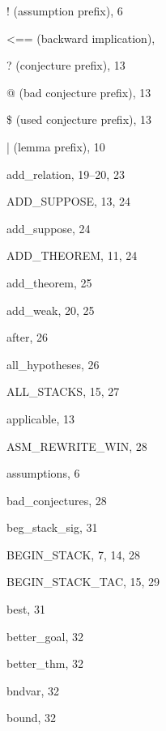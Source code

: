 \begin{theindex}

  \item {{\ptt !} (assumption prefix)}, 6
  \item {{\ptt <==} (backward implication)}, 
  \item {{\ptt ?} (conjecture prefix)}, 13
  \item {{\ptt @} (bad conjecture prefix)}, 13
  \item {{\ptt \$} (used conjecture prefix)}, 13
  \item {{\ptt |} (lemma prefix)}, 10

  \indexspace

  \item {\ptt add\_relation}, 19--20, 23
  \item {\ptt ADD\_SUPPOSE}, 13, 24
  \item {\ptt add\_suppose}, 24
  \item {\ptt ADD\_THEOREM}, 11, 24
  \item {\ptt add\_theorem}, 25
  \item {\ptt add\_weak}, 20, 25
  \item {\ptt after}, 26
  \item {\ptt all\_hypotheses}, 26
  \item {\ptt ALL\_STACKS}, 15, 27
  \item applicable, 13
  \item {\ptt ASM\_REWRITE\_WIN}, 28
  \item assumptions, 6

  \indexspace

  \item {\ptt bad\_conjectures}, 28
  \item {\ptt beg\_stack\_sig}, 31
  \item {\ptt BEGIN\_STACK}, 7, 14, 28
  \item {\ptt BEGIN\_STACK\_TAC}, 15, 29
  \item {\ptt best}, 31
  \item {\ptt better\_goal}, 32
  \item {\ptt better\_thm}, 32
  \item {\ptt bndvar}, 32
  \item {\ptt bound}, 32

  \indexspace


\end{theindex}
